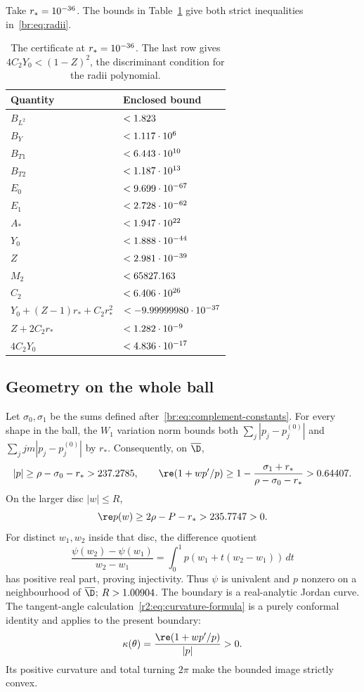 Take $r_*=10^{-36}$. The bounds in Table~\ref{br:tab:constants} give
both strict inequalities in~\eqref{br:eq:radii}.
\begin{table}[htbp]
\centering
\begin{tabular}{ll}
\toprule
Quantity & Enclosed bound\\
\midrule
$B_{L^2}$ & $<1.823$\\
$B_Y$ & $<1.117\cdot10^6$\\
$B_{T1}$ & $<6.443\cdot10^{10}$\\
$B_{T2}$ & $<1.187\cdot10^{13}$\\
$E_0$ & $<9.699\cdot10^{-67}$\\
$E_1$ & $<2.728\cdot10^{-62}$\\
$A_*$ & $<1.947\cdot10^{22}$\\
$Y_0$ & $<1.888\cdot10^{-44}$\\
$Z$ & $<2.981\cdot10^{-39}$\\
$M_2$ & $<65827.163$\\
$C_2$ & $<6.406\cdot10^{26}$\\
$Y_0+(Z-1)r_*+C_2r_*^2$ & $<-9.99999980\cdot10^{-37}$\\
$Z+2C_2r_*$ & $<1.282\cdot10^{-9}$\\
$4C_2Y_0$ & $<4.836\cdot10^{-17}$\\
\bottomrule
\end{tabular}
\caption{The certificate at $r_*=10^{-36}$. The last row gives
$4C_2Y_0<(1-Z)^2$, the discriminant condition for the radii polynomial.}
\label{br:tab:constants}
\end{table}

\subsection{Geometry on the whole ball}\label{br:sec:geometry}
Let $\sigma_0,\sigma_1$ be the sums defined
after~\eqref{br:eq:complement-constants}.
For every shape in the ball, the $W_1$ variation norm bounds both
$\sum_j|p_j-p_j^{(0)}|$ and
$\sum_jjm|p_j-p_j^{(0)}|$ by $r_*$. Consequently, on $\overline\D$,
\begin{equation}\label{br:eq:whole-ball-geometry}
 |p|\ge\rho-\sigma_0-r_*>\brDerivativeLo,
 \qquad
 \re(1+wp'/p)\ge1-\frac{\sigma_1+r_*}{\rho-\sigma_0-r_*}
 >\brConvexLo.
\end{equation}
On the larger disc $|w|\le R$,
\begin{equation}\label{br:eq:univalence}
 \re p(w)\ge2\rho-P-r_*>\brUnivalentLo>0.
\end{equation}
For distinct $w_1,w_2$ inside that disc, the difference quotient
\[
 \frac{\psi(w_2)-\psi(w_1)}{w_2-w_1}
 =\int_0^1p(w_1+t(w_2-w_1))\,dt
\]
has positive real part, proving injectivity. Thus $\psi$ is univalent
and $p$ nonzero on a neighbourhood of $\overline\D$; $R>1.00904$.
The boundary is a real-analytic Jordan curve. The tangent-angle
calculation~\eqref{r2:eq:curvature-formula} is a purely conformal
identity and applies to the present boundary:
\begin{equation}\label{br:eq:curvature}
 \kappa(\theta)=\frac{\re(1+wp'/p)}{|p|}>0.
\end{equation}
Its positive curvature and total turning $2\pi$ make the bounded image
strictly convex.

